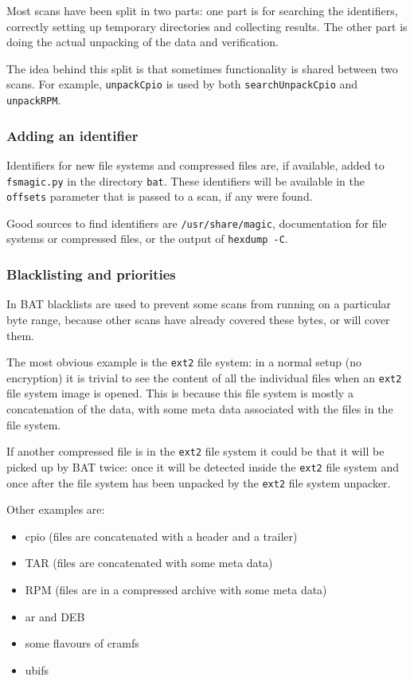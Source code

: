 \documentclass[10pt]{article}
\begin{document}
Most scans have been split in two parts: one part is for searching the
identifiers, correctly setting up temporary directories and collecting results.
The other part is doing the actual unpacking of the data and verification.

The idea behind this split is that sometimes functionality is shared between
two scans. For example, \texttt{unpackCpio} is used by both
\texttt{searchUnpackCpio} and \texttt{unpackRPM}.

\subsubsection{Adding an identifier}

Identifiers for new file systems and compressed files are, if available, added
to \texttt{fsmagic.py} in the directory \texttt{bat}. These identifiers will be
available in the \texttt{offsets} parameter that is passed to a scan, if any
were found.

Good sources to find identifiers are \texttt{/usr/share/magic}, documentation
for file systems or compressed files, or the output of \texttt{hexdump -C}.

\subsubsection{Blacklisting and priorities}

In BAT blacklists are used to prevent some scans from running on a particular
byte range, because other scans have already covered these bytes, or will cover
them.

The most obvious example is the \texttt{ext2} file system: in a normal setup
(no encryption) it is trivial to see the content of all the individual files
when an \texttt{ext2} file system image is opened. This is because this file
system is mostly a concatenation of the data, with some meta data associated
with the files in the file system.

If another compressed file is in the \texttt{ext2} file system it could be that
it will be picked up by BAT twice: once it will be detected inside the
\texttt{ext2} file system and once after the file system has been unpacked by
the \texttt{ext2} file system unpacker.

Other examples are:

\begin{itemize}
\item cpio (files are concatenated with a header and a trailer)
\item TAR (files are concatenated with some meta data)
\item RPM (files are in a compressed archive with some meta data)
\item ar and DEB
\item some flavours of cramfs
\item ubifs
\end{itemize}
\end{document}
